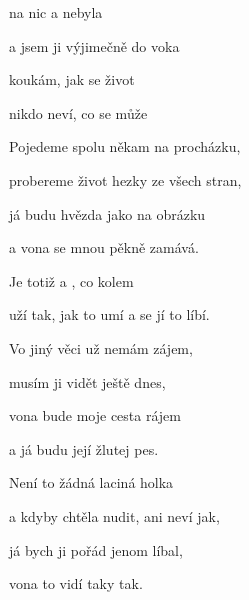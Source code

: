 

\zs
{} na nic a nebyla 

a  jsem ji výjimečně do voka 

 koukám, jak se život 

 nikdo neví, co se může 
\ks

\zs
Pojedeme spolu někam na procházku,

probereme život hezky ze všech stran,

já budu hvězda jako na obrázku

a vona se mnou pěkně zamává.
\ks

\zr
{Je} totiž  a , co kolem 

 uží tak, jak to umí a  se jí to líbí.
\kr

\zs
Vo jiný věci už nemám zájem,

musím ji vidět ještě dnes,

vona bude moje cesta rájem

a já budu její žlutej pes.
\ks

\zs
Není to žádná laciná holka

a kdyby chtěla nudit, ani neví jak,

já bych ji pořád jenom líbal,

vona to vidí taky tak.
\ks

\zr  \kr  \zr  \kr

\kp





